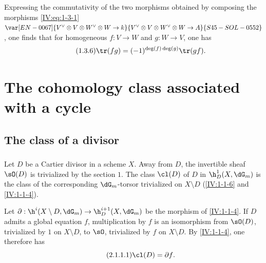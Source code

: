 Expressing the commutativity of the two morphisms obtained by composing the
morphisms \eqref{IV:eq:1-3-1}
$\var[EN-0067]{V^\vee\otimes V\otimes W^\vee\otimes W\to k}{V^\vee\otimes V\otimes W^\vee\otimes W\to A}{S45-SOL-0552}$, one finds that for homogeneous
$f:V\to W$ and $g:W\to V$, one has
\begin{equation*}\tag{1.3.6}\label{IV:eq:1-3-6}
  \tr(f g) = (-1)^{\deg(f)\deg(g)} \tr(g f) \text{.}
\end{equation*}




















\section{The cohomology class associated with a cycle}\label{IV:2}










\subsection{The class of a divisor}\label{IV:2-1}






\subsubsection{}\label{IV:2-1-1}

Let $D$ be a Cartier divisor in a scheme $X$. Away from $D$, the invertible
sheaf $\sO(D)$ is trivialized by the section $1$. The class $\cl(D)$ of $D$
in $\h_D^1(X,\dG_m)$ is the class of the corresponding $\dG_m$-torsor
trivialized on $X\setminus D$ (\ref{IV:1-1-6} and \ref{IV:1-1-4}).

Let $\partial:\h^i(X\setminus D,\dG_m)\to \h_D^{i+1}(X,\dG_m)$ be the morphism
of \ref{IV:1-1-4}. If $D$ admits a global equation $f$, multiplication by
$f$ is an isomorphism from $\sO(D)$, trivialized by $1$ on $X\setminus D$,
to $\sO$, trivialized by $f$ on $X\setminus D$. By \ref{IV:1-1-4}, one
therefore has
\begin{equation*}\tag{2.1.1.1}\label{IV:eq:2-1-1}
  \cl(D) = \partial f \text{.}
\end{equation*}


